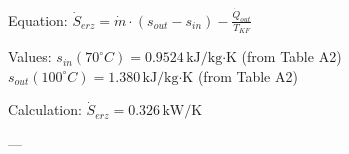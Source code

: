 Equation:  
\( \dot{S}_{erz} = \dot{m} \cdot (s_{out} - s_{in}) - \frac{\dot{Q}_{out}}{T_{KF}} \)  

Values:  
\( s_{in}(70^\circ C) = 0.9524 \, \text{kJ/kg·K} \) (from Table A2)  
\( s_{out}(100^\circ C) = 1.380 \, \text{kJ/kg·K} \) (from Table A2)  

Calculation:  
\( \dot{S}_{erz} = 0.326 \, \text{kW/K} \)  

---
